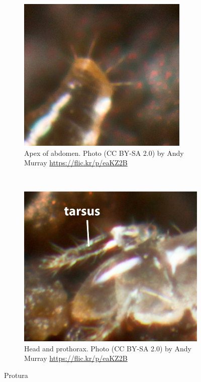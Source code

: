 \documentclass[letterpaper, 11pt]{article}
\begin{document}
\begin{figure}[ht!]
    \centering
    \begin{subfigure}[ht!]{0.33\textwidth}
        \includegraphics[width=\textwidth]{image06}
        \caption{Apex of abdomen. Photo (CC BY-SA 2.0) by Andy Murray \url{https://flic.kr/p/eaKZ2B}}
        \label{fig:protapex}
    \end{subfigure}
    ~ %
    \begin{subfigure}[ht!]{0.35\textwidth}
        \includegraphics[width=\textwidth]{image30}
        \caption{Head and prothorax. Photo (CC BY-SA 2.0) by Andy Murray \url{https://flic.kr/p/eaKZ2B}}
        \label{fig:prothead1}
    \end{subfigure}
    \caption{Protura}\label{fig:proturanmorph}
\end{figure}
\end{document}
